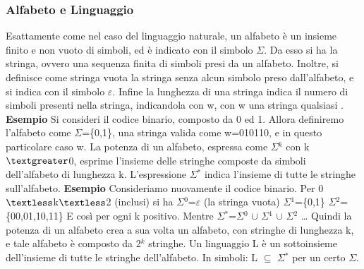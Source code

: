 \documentclass[]{article}
\begin{document}
			\subsubsection{Alfabeto e Linguaggio}
				Esattamente come nel caso del linguaggio naturale, un alfabeto è un insieme finito e non vuoto di simboli, ed è indicato con il simbolo $\Sigma$. Da esso si ha la stringa, ovvero una sequenza finita di simboli presi da un alfabeto. Inoltre, si definisce come stringa vuota la stringa senza alcun simbolo preso dall'alfabeto, e si indica con il simbolo $\varepsilon$. Infine la lunghezza di una stringa indica il numero di simboli presenti nella stringa, indicandola con \textbar w\textbar, con w una stringa qualsiasi .
				\newline
				\newline
				\textbf{Esempio}
				Si consideri il codice binario, composto da 0 ed 1. Allora definiremo l'alfabeto come $\Sigma$=\{0,1\}, una stringa valida come w=010110, e in questo particolare caso \textbar w\textbar=6.
				\newline
				\newline
				La potenza di un alfabeto, espressa come $\Sigma$$^k$ con k$\textgreater$0, esprime l'insieme delle stringhe composte da simboli dell'alfabeto di lunghezza k. L'espressione $\Sigma$$^*$ indica l'insieme di tutte le stringhe sull'alfabeto.
				\newline
				\newline
				\textbf{Esempio}
				Consideriamo nuovamente il codice binario. Per 0$\textless$k$\textless$2 (inclusi) si ha \newline
				$\Sigma$$^0$=$\varepsilon$ (la stringa vuota) \newline
				$\Sigma$$^1$=\{0,1\}\newline
				$\Sigma$$^2$=\{00,01,10,11\} \newline
				E così per ogni k positivo. Mentre $\Sigma$$^*$=$\Sigma$$^0$ $\cup$ $\Sigma$$^1$ $\cup$ $\Sigma$$^2$ \ldots \newline \newline 
				Quindi la potenza di un alfabeto crea a sua volta un alfabeto, con stringhe di lunghezza k, e tale alfabeto è composto da 2$^k$ stringhe. 
				\newline
				\newline
				Un linguaggio L è un sottoinsieme dell'insieme di tutte le stringhe dell'alfabeto. In simboli: L $\subseteq$ $\Sigma$$^*$ per un certo $\Sigma$.
\end{document}
